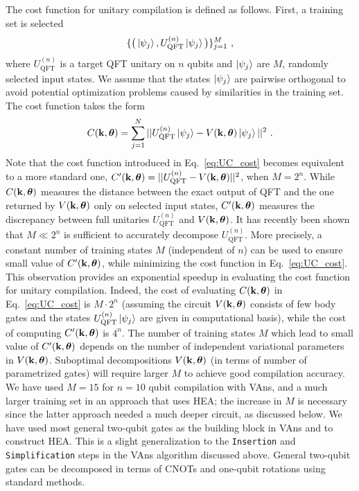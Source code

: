 The cost function for unitary compilation is defined as follows. First, a training set is selected
\begin{equation} \label{eq:UC_training_set}
	\{ \big(
	\ket{\psi_j} , U_\mathrm{QFT}^{(n)} \ket{\psi_j}
	\big) \}_{j=1}^M \ ,
\end{equation}
where $U_\mathrm{QFT}^{(n)}$ is a target QFT unitary on $n$ qubits and $\ket{\psi_j}$ are $M$, randomly selected input states. We assume that the states $\ket{\psi_j}$ are pairwise orthogonal to avoid potential optimization problems caused by similarities in the training set. The cost function takes the form
\begin{equation} \label{eq:UC_cost}
	C(\kvec,\thv) = \sum_{j=1}^N
	|| U_\mathrm{QFT}^{(n)}\ket{\psi_j} -
	V(\kvec,\thv) \ket{\psi_j} ||^2 \ .
\end{equation}
Note that the cost function introduced in Eq.~\eqref{eq:UC_cost} becomes equivalent to a more standard one, $C'(\mathbf{k},\bm{\theta}) = || U_\mathrm{QFT}^{(n)} - V(\mathbf{k},\bm{\theta})||^2$, when $M=2^n$. While $C(\mathbf{k},\bm{\theta})$ measures the distance between the exact output of QFT and the one returned by $V(\mathbf{k},\bm{\theta})$ only on selected input states, $C'(\mathbf{k},\bm{\theta})$ measures the discrepancy between full unitaries $U_\mathrm{QFT}^{(n)}$ and $V(\mathbf{k},\bm{\theta})$.
%
It has recently been shown~\cite{caro2021generalization} that $M \ll 2^n$ is sufficient to accurately decompose $U_\mathrm{QFT}^{(n)}$. More precisely, a constant number of training states $M$ (independent of $n$) can be used to ensure small value of $C'(\mathbf{k},\bm{\theta})$, while minimizing the cost function in Eq.~\ref{eq:UC_cost}.
This observation provides an exponential speedup in evaluating the cost function for unitary compilation. Indeed, the cost of evaluating $C(\mathbf{k},\bm{\theta})$ in Eq.~\eqref{eq:UC_cost} is $M \cdot 2^n$ (assuming the circuit $V(\mathbf{k},\bm{\theta})$ consists of few body gates and the states $U_\mathrm{QFT}^{(n)} \ket{\psi_j} $ are given in computational basis), while the cost of computing $C'(\mathbf{k},\bm{\theta})$ is $4^n$.
%
The number of training states $M$ which lead to small value of $C'(\mathbf{k},\bm{\theta})$ depends on the number of independent variational parameters in $V(\mathbf{k},\bm{\theta})$. Suboptimal decompositions $V(\mathbf{k},\bm{\theta})$ (in terms of number of parametrized gates) will require larger $M$ to achieve good compilation accuracy. We have used $M = 15$ for $n=10$ qubit compilation with VAns, and a much larger training set in an approach that uses HEA; the increase in $M$ is necessary since the latter approach needed a much deeper circuit, as discussed below.
%
We have used most general two-qubit gates as the building block in VAns and to construct HEA. This is a slight generalization to the \texttt{Insertion} and \texttt{Simplification} steps in the VAns algorithm discussed above. %
General two-qubit gates can be decomposed in terms of CNOTs and one-qubit rotations using standard methods.

